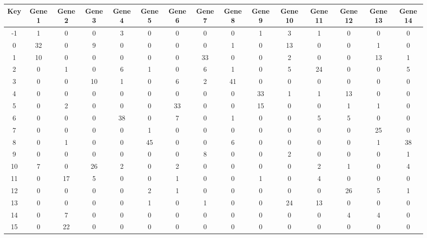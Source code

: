 \begin{tabular}{|c|c|c|c|c|c|c|c|c|c|c|c|c|c|c|}
\hline
Key & Gene 1 & Gene 2 & Gene 3 & Gene 4 & Gene 5 & Gene 6 & Gene 7 & Gene 8 & Gene 9 & Gene 10 & Gene 11 & Gene 12 & Gene 13 & Gene 14 \\
\hline
-1 & 1 & 0 & 0 & 3 & 0 & 0 & 0 & 0 & 1 & 3 & 1 & 0 & 0 & 0 \\
0 & 32 & 0 & 9 & 0 & 0 & 0 & 0 & 1 & 0 & 13 & 0 & 0 & 1 & 0 \\
1 & 10 & 0 & 0 & 0 & 0 & 0 & 33 & 0 & 0 & 2 & 0 & 0 & 13 & 1 \\
2 & 0 & 1 & 0 & 6 & 1 & 0 & 6 & 1 & 0 & 5 & 24 & 0 & 0 & 5 \\
3 & 0 & 0 & 10 & 1 & 0 & 6 & 2 & 41 & 0 & 0 & 0 & 0 & 0 & 0 \\
4 & 0 & 0 & 0 & 0 & 0 & 0 & 0 & 0 & 33 & 1 & 1 & 13 & 0 & 0 \\
5 & 0 & 2 & 0 & 0 & 0 & 33 & 0 & 0 & 15 & 0 & 0 & 1 & 1 & 0 \\
6 & 0 & 0 & 0 & 38 & 0 & 7 & 0 & 1 & 0 & 0 & 5 & 5 & 0 & 0 \\
7 & 0 & 0 & 0 & 0 & 1 & 0 & 0 & 0 & 0 & 0 & 0 & 0 & 25 & 0 \\
8 & 0 & 1 & 0 & 0 & 45 & 0 & 0 & 6 & 0 & 0 & 0 & 0 & 1 & 38 \\
9 & 0 & 0 & 0 & 0 & 0 & 0 & 8 & 0 & 0 & 2 & 0 & 0 & 0 & 1 \\
10 & 7 & 0 & 26 & 2 & 0 & 2 & 0 & 0 & 0 & 0 & 2 & 1 & 0 & 4 \\
11 & 0 & 17 & 5 & 0 & 0 & 1 & 0 & 0 & 1 & 0 & 4 & 0 & 0 & 0 \\
12 & 0 & 0 & 0 & 0 & 2 & 1 & 0 & 0 & 0 & 0 & 0 & 26 & 5 & 1 \\
13 & 0 & 0 & 0 & 0 & 1 & 0 & 1 & 0 & 0 & 24 & 13 & 0 & 0 & 0 \\
14 & 0 & 7 & 0 & 0 & 0 & 0 & 0 & 0 & 0 & 0 & 0 & 4 & 4 & 0 \\
15 & 0 & 22 & 0 & 0 & 0 & 0 & 0 & 0 & 0 & 0 & 0 & 0 & 0 & 0 \\
\hline
\end{tabular}